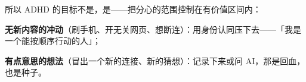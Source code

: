 所以 ADHD 的目标不是，是——把分心的范围控制在有价值区间内：

\begin{checklist}
  \item \textbf{无新内容的冲动}（刷手机、开无关网页、想断连）：用身份认同压下去——「我是一个能按顺序行动的人」；
  \item \textbf{有点意思的想法}（冒出一个新的连接、新的猜想）：记录下来或问 AI，那是回血，也是种子。
\end{checklist}

